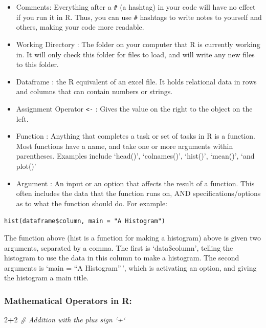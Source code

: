 \documentclass[]{article}
\newenvironment{Shaded}{\begin{snugshade}}{\end{snugshade}}
\newcommand{\DecValTok}[1]{\textcolor[rgb]{0.00,0.00,0.81}{#1}}
\newcommand{\CommentTok}[1]{\textcolor[rgb]{0.56,0.35,0.01}{\textit{#1}}}
\newcommand{\OperatorTok}[1]{\textcolor[rgb]{0.81,0.36,0.00}{\textbf{#1}}}
\providecommand{\tightlist}{%
  \setlength{\itemsep}{0pt}\setlength{\parskip}{0pt}}
\begin{document}
\begin{itemize}
\tightlist
\item
  Comments: Everything after a \texttt{\#} (a hashtag) in your code will
  have no effect if you run it in R. Thus, you can use \texttt{\#}
  hashtags to write notes to yourself and others, making your code more
  readable.
\item
  Working Directory : The folder on your computer that R is currently
  working in. It will only check this folder for files to load, and will
  write any new files to this folder.
\item
  Dataframe : the R equivalent of an excel file. It holds relational
  data in rows and columns that can contain numbers or strings.
\item
  Assignment Operator \texttt{\textless{}-} : Gives the value on the
  right to the object on the left.
\item
  Function : Anything that completes a task or set of tasks in R is a
  function. Most functions have a name, and take one or more arguments
  within parentheses. Examples include `head()', `colnames()', `hist()',
  `mean()', `and plot()'\\
\item
  Argument : An input or an option that affects the result of a
  function. This often includes the data that the function runs on, AND
  specifications/options as to what the function should do. For example:
\end{itemize}

\texttt{hist(dataframe\$column,\ main\ =\ "A\ Histogram")}

The function above (hist is a function for making a histogram) above is
given two arguments, separated by a comma. The first is `data\$column',
telling the histogram to use the data in this column to make a
histogram. The second arguments is `main = ``A Histogram''\,', which is
activating an option, and giving the histogram a main title.

\subsubsection{Mathematical Operators in
R:}\label{mathematical-operators-in-r}

\begin{Shaded}
\begin{Highlighting}[]
\DecValTok{2}\OperatorTok{+}\DecValTok{2} \CommentTok{# Addition with the plus sign `+`}
\end{Highlighting}
\end{Shaded}
\end{document}
